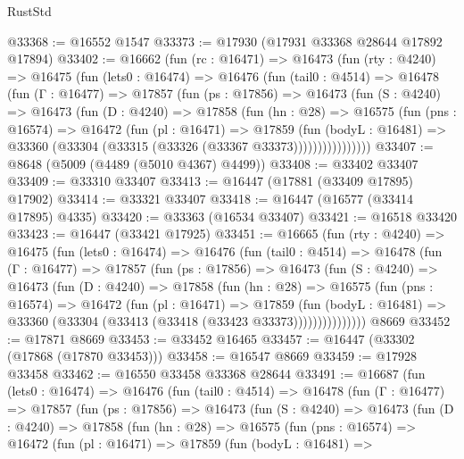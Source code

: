 \begin{lexlean}{RustStd}
\begin{coremodule}
@33368 := @16552 @1547
@33373 := @17930 (@17931 @33368 @28644 @17892 @17894)
@33402 := @16662
    (fun (rc : @16471) =>
    @16473
      (fun (rty : @4240) =>
      @16475
        (fun (lets0 : @16474) =>
        @16476
          (fun (tail0 : @4514) =>
          @16478
            (fun (Γ : @16477) =>
            @17857
              (fun (ps : @17856) =>
              @16473
                (fun (S : @4240) =>
                @16473
                  (fun (D : @4240) =>
                  @17858
                    (fun (hn : @28) =>
                    @16575
                      (fun (pns : @16574) =>
                      @16472
                        (fun (pl : @16471) =>
                        @17859
                          (fun (bodyL : @16481) =>
                          @33360 (@33304 (@33315 (@33326 (@33367 @33373))))))))))))))))
@33407 := @8648 (@5009 (@4489 (@5010 @4367) @4499))
@33408 := @33402 @33407
@33409 := @33310 @33407
@33413 := @16447 (@17881 (@33409 @17895) @17902)
@33414 := @33321 @33407
@33418 := @16447 (@16577 (@33414 @17895) @4335)
@33420 := @33363 (@16534 @33407)
@33421 := @16518 @33420
@33423 := @16447 (@33421 @17925)
@33451 := @16665
    (fun (rty : @4240) =>
    @16475
      (fun (lets0 : @16474) =>
      @16476
        (fun (tail0 : @4514) =>
        @16478
          (fun (Γ : @16477) =>
          @17857
            (fun (ps : @17856) =>
            @16473
              (fun (S : @4240) =>
              @16473
                (fun (D : @4240) =>
                @17858
                  (fun (hn : @28) =>
                  @16575
                    (fun (pns : @16574) =>
                    @16472
                      (fun (pl : @16471) =>
                      @17859
                        (fun (bodyL : @16481) =>
                        @33360 (@33304 (@33413 (@33418 (@33423 @33373)))))))))))))))
    @8669
@33452 := @17871 @8669
@33453 := @33452 @16465
@33457 := @16447 (@33302 (@17868 (@17870 @33453)))
@33458 := @16547 @8669
@33459 := @17928 @33458
@33462 := @16550 @33458 @33368 @28644
@33491 := @16687
    (fun (lets0 : @16474) =>
    @16476
      (fun (tail0 : @4514) =>
      @16478
        (fun (Γ : @16477) =>
        @17857
          (fun (ps : @17856) =>
          @16473
            (fun (S : @4240) =>
            @16473
              (fun (D : @4240) =>
              @17858
                (fun (hn : @28) =>
                @16575
                  (fun (pns : @16574) =>
                  @16472
                    (fun (pl : @16471) =>
                    @17859
                      (fun (bodyL : @16481) =>

\end{coremodule}
\end{lexlean}
